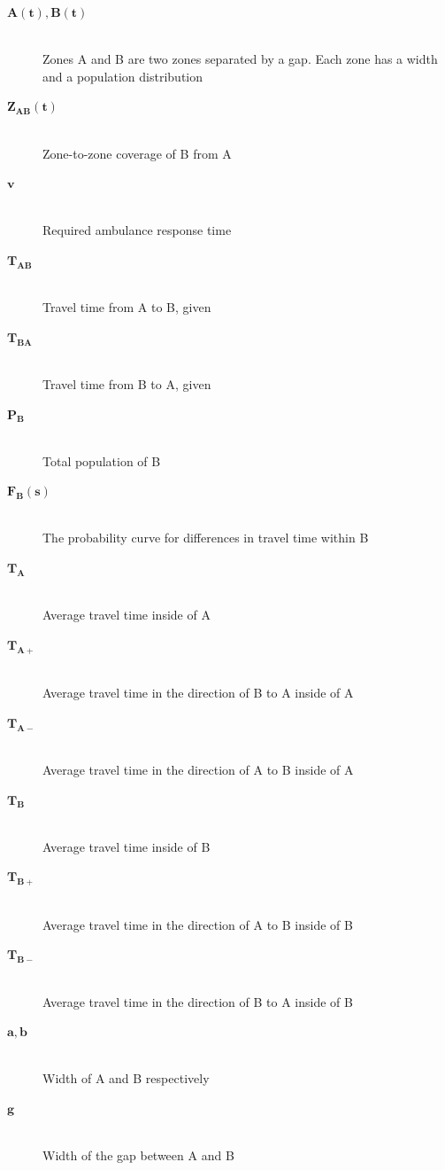 \documentclass[notitlepage, 12pt]{article}
\begin{document}
\begin{description}
    \item[$\mathbf{A(t), B(t)}$] \hfill \\
    	Zones A and B are two zones separated by a gap. Each zone has a width and a population distribution
    \item[$\mathbf{Z_{AB}(t)}$] \hfill \\
    	Zone-to-zone coverage of B from A
    \item[$\mathbf{v}$] \hfill \\
    	Required ambulance response time
    \item[$\mathbf{T_{AB}}$] \hfill \\
    	Travel time from A to B, given
    \item[$\mathbf{T_{BA}}$] \hfill \\
    	Travel time from B to A, given
    \item[$\mathbf{P_B}$] \hfill \\
    	Total population of B
    \item[$\mathbf{F_B(s)}$] \hfill \\
    	The probability curve for differences in travel time within B
   \item[$\mathbf{T_A}$] \hfill \\
    	Average travel time inside of A
    \item[$\mathbf{T_{A+}}$] \hfill \\
    	Average travel time in the direction of B to A inside of A
    \item[$\mathbf{T_{A-}}$] \hfill \\
    	Average travel time in the direction of A to B inside of A
   \item[$\mathbf{T_B}$] \hfill \\
    	Average travel time inside of B
    \item[$\mathbf{T_{B+}}$] \hfill \\
    	Average travel time in the direction of A to B inside of B
    \item[$\mathbf{T_{B-}}$] \hfill \\
    	Average travel time in the direction of B to A inside of B
    \item[$\mathbf{a, b}$] \hfill \\
    	Width of A and B respectively
    \item[$\mathbf{g}$] \hfill \\
    	Width of the gap between A and B
\end{description}
\end{document}
